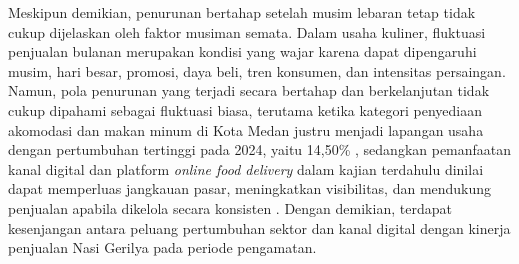 Meskipun demikian, penurunan bertahap setelah musim lebaran tetap tidak cukup dijelaskan oleh faktor musiman semata. Dalam usaha kuliner, fluktuasi penjualan bulanan merupakan kondisi yang wajar karena dapat dipengaruhi musim, hari besar, promosi, daya beli, tren konsumen, dan intensitas persaingan. Namun, pola penurunan yang terjadi secara bertahap dan berkelanjutan tidak cukup dipahami sebagai fluktuasi biasa, terutama ketika kategori penyediaan akomodasi dan makan minum di Kota Medan justru menjadi lapangan usaha dengan pertumbuhan tertinggi pada 2024, yaitu 14,50\% \parencite{bpsmedan2025ekonomi}, sedangkan pemanfaatan kanal digital dan platform \textit{online food delivery} dalam kajian terdahulu dinilai dapat memperluas jangkauan pasar, meningkatkan visibilitas, dan mendukung penjualan apabila dikelola secara konsisten \parencite{regina2025kuliner,sophia2025rendanggadih,suharjo2020bogorsnacks}. Dengan demikian, terdapat kesenjangan antara peluang pertumbuhan sektor dan kanal digital dengan kinerja penjualan Nasi Gerilya pada periode pengamatan.

